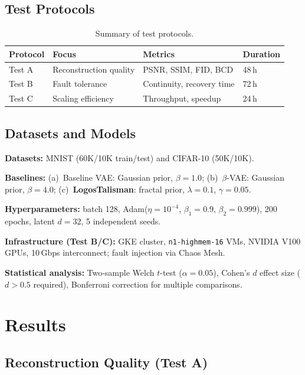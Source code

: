 \documentclass{article}
\begin{document}
\subsection{Test Protocols}

\begin{table}[h]
\centering
\caption{Summary of test protocols.}
\label{tab:protocols}
\begin{tabular}{@{}llll@{}}
\toprule
Protocol & Focus & Metrics & Duration \\
\midrule
Test A & Reconstruction quality & PSNR, SSIM, FID, BCD & 48\,h \\
Test B & Fault tolerance        & Continuity, recovery time & 72\,h \\
Test C & Scaling efficiency     & Throughput, speedup & 24\,h \\
\bottomrule
\end{tabular}
\end{table}

\subsection{Datasets and Models}

\textbf{Datasets:} MNIST (60K/10K train/test) and CIFAR-10 (50K/10K).

\textbf{Baselines:}
(a)~Baseline VAE: Gaussian prior, $\beta{=}1.0$;
(b)~$\beta$-VAE: Gaussian prior, $\beta{=}4.0$;
(c)~\textbf{LogosTalisman}: fractal prior, $\lambda{=}0.1$,
$\gamma{=}0.05$.

\textbf{Hyperparameters:} batch 128, Adam($\eta{=}10^{-4}$,
$\beta_1{=}0.9$, $\beta_2{=}0.999$), 200 epochs, latent $d{=}32$,
5 independent seeds.

\textbf{Infrastructure (Test B/C):} GKE cluster, \texttt{n1-highmem-16}
VMs, NVIDIA V100 GPUs, 10\,Gbps interconnect; fault injection via Chaos Mesh.

\textbf{Statistical analysis:} Two-sample Welch $t$-test ($\alpha{=}0.05$),
Cohen's $d$ effect size ($d{>}0.5$ required), Bonferroni correction for
multiple comparisons.

\section{Results}
\label{sec:results}

\subsection{Reconstruction Quality (Test A)}
\end{document}
